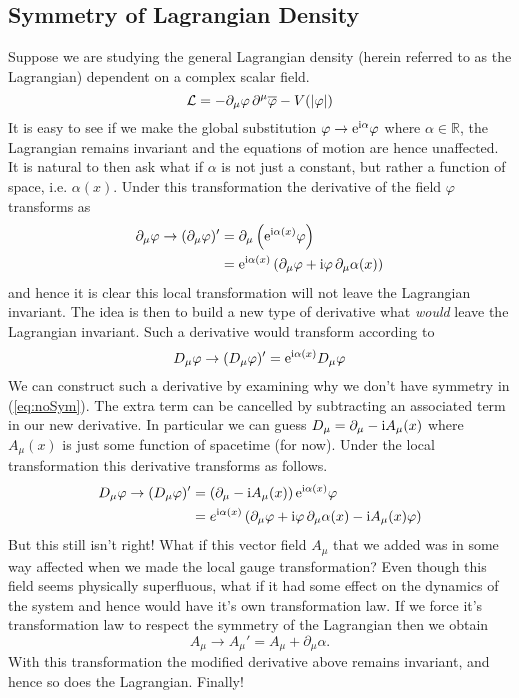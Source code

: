 \subsection{Symmetry of Lagrangian Density}\label{lagdensym}
Suppose we are studying the general Lagrangian density (herein referred to as
the Lagrangian) dependent on a complex scalar field.
\begin{equation}\label{eq:complexScalar}
    \mathcal{L} = -\partial_\mu\varphi\,\partial^\mu\overline{\varphi} - V(|\varphi|)
\end{equation}
It is easy to see if we make the global substitution \(\varphi\to\mathrm{e}^{\mathrm{i} \alpha}\varphi\) where \(\alpha\in \mathbb{R}\), the Lagrangian remains invariant and the equations of motion are hence unaffected. It is natural to then ask what if \(\alpha\) is not just a constant, but rather a function of space, i.e. \(\alpha(x)\). Under this transformation the derivative of the field \(\varphi\) transforms as
\begin{align}\label{eq:noSym}
    \partial_\mu\varphi\to (\partial_\mu\varphi)' & = \partial_\mu\left(\mathrm{e}^{\mathrm{i}\alpha(x)}\varphi\right) \nonumber\\
                                                  & = \mathrm{e}^{\mathrm{i}\alpha(x)}\left(\partial_\mu\varphi + \mathrm{i}\varphi\,\partial_\mu\alpha(x)\right)
\end{align}
and hence it is clear this local transformation will not leave the Lagrangian
invariant. The idea is then to build a new type of derivative what
\textit{would} leave the Lagrangian invariant. Such a derivative would transform
according to
\begin{equation*}
    D_\mu\varphi\to(D_\mu\varphi)' = \mathrm{e}^{\mathrm{i}\alpha(x)}D_\mu\varphi
\end{equation*}
We can construct such a derivative by examining why we don't have symmetry in
(\ref{eq:noSym}). The extra term can be cancelled by subtracting an associated
term in our new derivative. In particular we can guess
\(D_\mu = \partial_\mu - \mathrm{i} A_\mu(x)\) where \(A_\mu(x)\) is just some function
of spacetime (for now). Under the local transformation this derivative
transforms as follows.
\begin{align*}
    D_\mu\varphi \to (D_\mu\varphi)' & = \left(\partial_\mu  - \mathrm{i} A_\mu(x)\right)\mathrm{e}^{\mathrm{i}\alpha(x)}\varphi \\
                                     & = e^{\mathrm{i}\alpha(x)}\left(\partial_\mu\varphi + \mathrm{i} \varphi\, \partial_\mu \alpha(x) - \mathrm{i} A_\mu(x)\varphi\right)
\end{align*}
But this still isn't right! What if this vector field \(A_\mu\) that we added
was in some way affected when we made the local gauge transformation? Even
though this field seems physically superfluous, what if it had some effect on
the dynamics of the system and hence would have it's own transformation law. If
we force it's transformation law to respect the symmetry of the Lagrangian then
we obtain
\begin{equation}\label{eq:vectorTrans}
    A_\mu\to A_\mu' = A_\mu + \partial_\mu\alpha.
\end{equation}
With this transformation the modified derivative above remains invariant, and
hence so does the Lagrangian. Finally!

